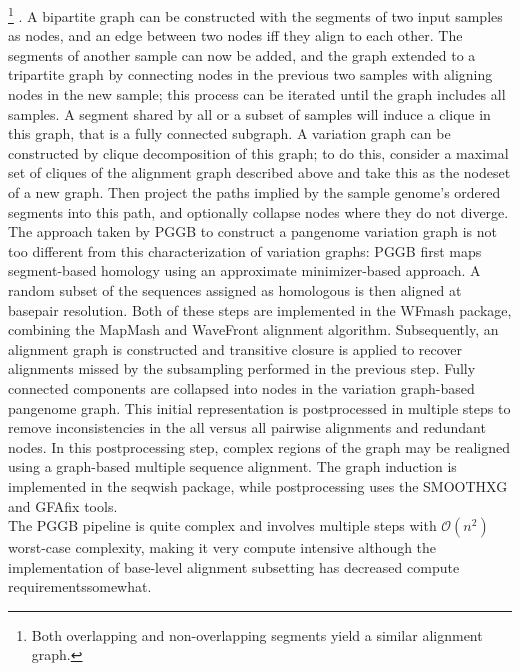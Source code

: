 \footnote{Both overlapping and non-overlapping segments yield a similar alignment graph.}
. A bipartite graph can be constructed with the segments of two input samples as nodes, and an edge between two nodes iff they align to each other.
The segments of another sample can now be added, and the graph extended to a tripartite graph by connecting nodes in the previous two samples with aligning nodes in the new sample; this process can be iterated until the graph includes all samples.
A segment shared by all or a subset of samples will induce a clique in this graph, that is a fully connected subgraph.
A variation graph can be constructed by clique decomposition of this graph; to do this, consider a maximal set of cliques of the alignment graph described above and take this as the nodeset of a new graph.
Then project the paths implied by the sample genome's ordered segments into this path, and optionally collapse nodes where they do not diverge.
\\
The approach taken by PGGB to construct a pangenome variation graph is not too different from this characterization of variation graphs:
PGGB first maps segment-based homology using an approximate minimizer-based approach.
A random subset of the sequences assigned as homologous is then aligned at basepair resolution.
Both of these steps are implemented in the WFmash package, combining the MapMash and WaveFront alignment algorithm\cite{marco-sola20, kille23}.
Subsequently, an alignment graph is constructed and transitive closure is applied to recover alignments missed by the subsampling performed in the previous step\cite{garrison22, garrison24}.
Fully connected components are collapsed into nodes in the variation graph-based pangenome graph.
This initial representation is postprocessed in multiple steps to remove inconsistencies in the all versus all pairwise alignments and redundant nodes.
In this postprocessing step, complex regions of the graph may be realigned using a graph-based multiple sequence alignment. 
The graph induction is implemented in the seqwish package, while postprocessing uses the SMOOTHXG and GFAfix tools\cite{garrison22, garrison24, gfafix}.\\
The PGGB pipeline is quite complex and involves multiple steps with $\mathcal{O}(n^2)$ worst-case complexity, making it very compute intensive although the implementation of base-level alignment subsetting has decreased compute requirementssomewhat.
